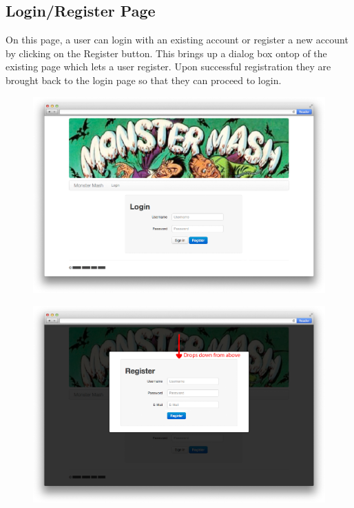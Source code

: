 \subsection{Login/Register Page}
On this page, a user can login with an existing account or register a new account by clicking on the Register button. This brings up a dialog box ontop of the existing page which lets a user register. Upon successful registration they are brought back to the login page so that they can proceed to login.
\begin{figure}[h]
\centering
\includegraphics[width=1.00\textwidth]{login.png}
\label{fig:login}
\end{figure}
\begin{figure}[h]
\centering
\includegraphics[width=1.00\textwidth]{register.png}
\label{fig:register}
\end{figure}

